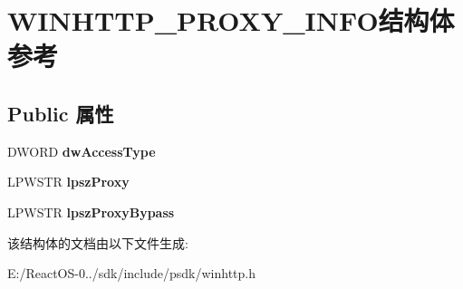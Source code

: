 \hypertarget{struct_w_i_n_h_t_t_p___p_r_o_x_y___i_n_f_o}{}\section{W\+I\+N\+H\+T\+T\+P\+\_\+\+P\+R\+O\+X\+Y\+\_\+\+I\+N\+F\+O结构体 参考}
\label{struct_w_i_n_h_t_t_p___p_r_o_x_y___i_n_f_o}
\subsection*{Public 属性}
\begin{DoxyCompactItemize}
\item 
\mbox{\label{struct_w_i_n_h_t_t_p___p_r_o_x_y___i_n_f_o_ad620af186bd51fa77da81445df5f4434}} 
D\+W\+O\+RD {\bfseries dw\+Access\+Type}
\item 
\mbox{\label{struct_w_i_n_h_t_t_p___p_r_o_x_y___i_n_f_o_adf005895f8cb50eb6a6d7efd3e3cc12b}} 
L\+P\+W\+S\+TR {\bfseries lpsz\+Proxy}
\item 
\mbox{\label{struct_w_i_n_h_t_t_p___p_r_o_x_y___i_n_f_o_ab041fd4bae3c67e74b16d960863b20cf}} 
L\+P\+W\+S\+TR {\bfseries lpsz\+Proxy\+Bypass}
\end{DoxyCompactItemize}


该结构体的文档由以下文件生成\+:\begin{DoxyCompactItemize}
\item 
E\+:/\+React\+O\+S-\/0../sdk/include/psdk/winhttp.\+h\end{DoxyCompactItemize}
